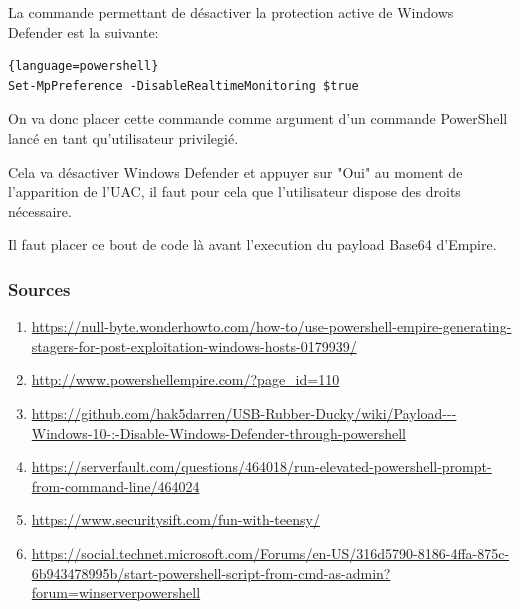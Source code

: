 La commande permettant de désactiver la protection active de Windows Defender est la suivante: 

\begin{lstlisting}{language=powershell}
Set-MpPreference -DisableRealtimeMonitoring $true
\end{lstlisting}

On va donc placer cette commande comme argument d'un commande PowerShell lancé en tant qu'utilisateur privilegié.

Cela va désactiver Windows Defender et appuyer sur "Oui" au moment de l'apparition de l'UAC, il faut pour cela que l'utilisateur dispose des droits nécessaire.

Il faut placer ce bout de code là avant l'execution du payload Base64 d'Empire.

\subsubsection{Sources}
\begin{enumerate}
    \item \url{https://null-byte.wonderhowto.com/how-to/use-powershell-empire-generating-stagers-for-post-exploitation-windows-hosts-0179939/}
    \item \url{http://www.powershellempire.com/?page_id=110}
    \item \url{https://github.com/hak5darren/USB-Rubber-Ducky/wiki/Payload---Windows-10-:-Disable-Windows-Defender-through-powershell}
    \item \url{https://serverfault.com/questions/464018/run-elevated-powershell-prompt-from-command-line/464024}
    \item \url{https://www.securitysift.com/fun-with-teensy/}
    \item \url{https://social.technet.microsoft.com/Forums/en-US/316d5790-8186-4ffa-875c-6b943478995b/start-powershell-script-from-cmd-as-admin?forum=winserverpowershell}
\end{enumerate}